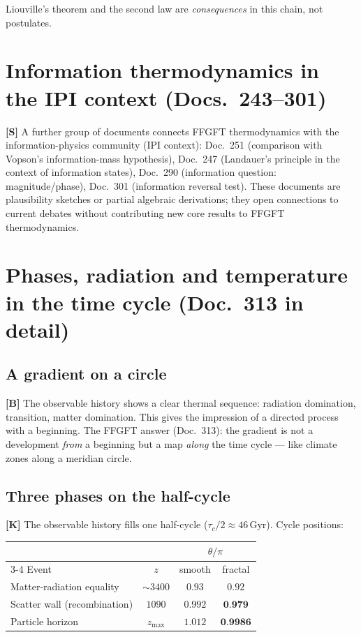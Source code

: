 Liouville's theorem and the second law are \emph{consequences}
in this chain, not postulates.

\section{Information thermodynamics in the IPI context (Docs.~243--301)}

\textbf{[S]} A further group of documents connects FFGFT thermodynamics
with the information-physics community (IPI context):
Doc.~251 (comparison with Vopson's information-mass hypothesis),
Doc.~247 (Landauer's principle in the context of information states),
Doc.~290 (information question: magnitude/phase),
Doc.~301 (information reversal test).
These documents are plausibility sketches or partial algebraic
derivations; they open connections to current debates without
contributing new core results to FFGFT thermodynamics.

\section{Phases, radiation and temperature in the time cycle (Doc.~313 in detail)}

\subsection{A gradient on a circle}

\textbf{[B]} The observable history shows a clear thermal sequence:
radiation domination, transition, matter domination. This gives the
impression of a directed process with a beginning. The FFGFT answer
(Doc.~313): the gradient is not a development \emph{from} a beginning
but a map \emph{along} the time cycle --- like climate zones along a
meridian circle.

\subsection{Three phases on the half-cycle}

\textbf{[K]} The observable history fills one half-cycle
($\tau_c/2 \approx 46$\,Gyr). Cycle positions:

\begin{center}
\small
\begin{tabular}{lccc}
\toprule
& & \multicolumn{2}{c}{$\theta/\pi$} \\
\cmidrule(l){3-4}
Event & $z$ & smooth & fractal \\
\midrule
Matter-radiation equality & $\sim\!3400$ & $0{.}93$ & $0{.}92$ \\
Scatter wall (recombination) & $1090$ & $0{.}992$ & $\mathbf{0{.}979}$ \\
Particle horizon & $z_\text{max}$ & $1{.}012$ & $\mathbf{0{.}9986}$ \\
\bottomrule
\end{tabular}
\end{center}

